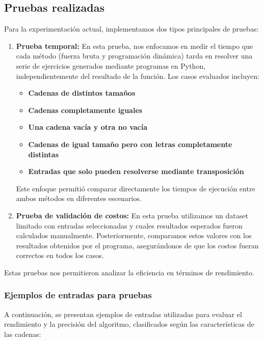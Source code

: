 \subsection*{Pruebas realizadas}

Para la experimentación actual, implementamos dos tipos principales de pruebas:

\begin{enumerate}
    \item \textbf{Prueba temporal:}  
    En esta prueba, nos enfocamos en medir el tiempo que cada método (fuerza bruta y programación dinámica) tarda en resolver una serie de ejercicios generados mediante programas en Python, independientemente del resultado de la función. Los casos evaluados incluyen:  
    \begin{itemize}
        \item \textbf{Cadenas de distintos tamaños}
        \item \textbf{Cadenas completamente iguales}
        \item \textbf{Una cadena vacía y otra no vacía}  
        \item \textbf{Cadenas de igual tamaño pero con letras completamente distintas}  
        \item \textbf{Entradas que solo pueden resolverse mediante transposición}  
    \end{itemize}
    Este enfoque permitió comparar directamente los tiempos de ejecución entre ambos métodos en diferentes escenarios.

    \item \textbf{Prueba de validación de costos:}  
    En esta prueba utilizamos un dataset limitado con entradas seleccionadas y cuales resultados esperados fueron calculados manualmente. Posteriormente, comparamos estos valores con los resultados obtenidos por el programa, asegurándonos de que los costos fueran correctos en todos los casos.
\end{enumerate}

Estas pruebas nos permitieron analizar la eficiencia en términos de rendimiento.

\subsubsection*{Ejemplos de entradas para pruebas}

A continuación, se presentan ejemplos de entradas utilizadas para evaluar el rendimiento y la precisión del algoritmo, clasificados según las características de las cadenas:

